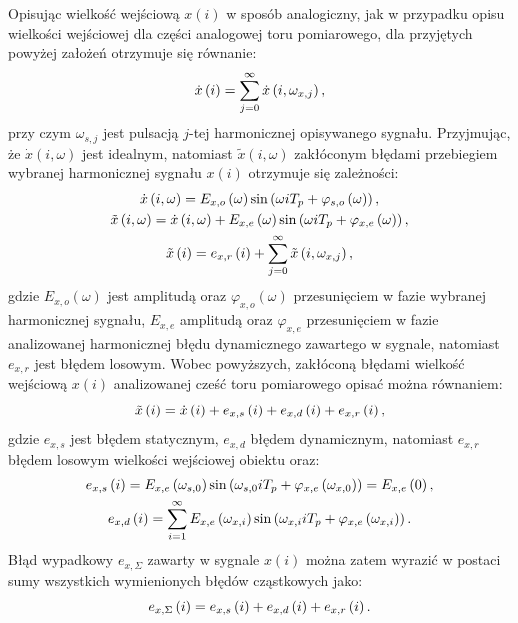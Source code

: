 Opisując wielkość wejściową $x(i)$ w sposób analogiczny, jak w przypadku opisu wielkości wejściowej dla części analogowej toru pomiarowego, dla przyjętych powyżej założeń otrzymuje się równanie:
\begin{equation}
\dot{x} \left(i\right) = \sum _{j = 0} ^{\infty} \dot{x} \left( i, \omega_{x,j} \right) \label{eq:in_disc_sum},
\end{equation}
przy czym $\omega_{s,j}$ jest pulsacją $j$-tej harmonicznej opisywanego sygnału. Przyjmując, że $\dot{x}(i, \omega)$ jest idealnym, natomiast $\tilde{x}(i, \omega)$ zakłóconym błędami przebiegiem wybranej harmonicznej sygnału $x(i)$ otrzymuje się zależności:
\begin{gather}
\dot{x} \left( i, \omega \right) = E_{x,o} \left(\omega\right) \sin \left( \omega iT_{p} + \varphi_{s,o} \left(\omega\right) \right) \label{eq:in_disc_omega_ideal}, \\
\tilde{x} \left( i, \omega \right) = \dot{x} \left( i, \omega \right) + E_{x,e} \left(\omega\right) \sin \left( \omega iT_{p} + \varphi_{x,e} \left(\omega\right) \right) \label{eq:in_disc_omega_real}, \\
\tilde{x} \left(i\right) = e_{x,r} \left(i\right) + \sum _{j = 0} ^{\infty} \tilde{x} \left( i, \omega_{x,j} \right) \label{eq:in_disc_sum_real},
\end{gather}
gdzie $E_{x,o}(\omega)$ jest amplitudą oraz $\varphi_{x,o}(\omega)$ przesunięciem w fazie wybranej harmonicznej sygnału, $E_{x,e}$ amplitudą oraz $ \varphi_{x,e}$ przesunięciem w fazie analizowanej harmonicznej błędu dynamicznego zawartego w sygnale, natomiast $e_{x,r}$ jest błędem losowym. Wobec powyższych, zakłóconą błędami wielkość wejściową $x(i)$ analizowanej cześć toru pomiarowego opisać można równaniem:
\begin{equation}
\tilde{x} \left(i\right) = \dot{x} \left(i\right) + e_{x,s} \left(i\right) + e_{x,d} \left(i\right) + e_{x,r} \left(i\right) \label{eq:in_disc_real},
\end{equation}
gdzie $e_{x,s}$ jest błędem statycznym, $e_{x,d}$ błędem dynamicznym, natomiast $e_{x,r}$ błędem losowym wielkości wejściowej obiektu oraz:
\begin{gather}
e_{x,s} \left(i\right) = E_{x,e} \left(\omega_{s,0}\right) \sin \left( \omega_{s,0} iT_{p} + \varphi_{x,e} \left(\omega_{x,0}\right) \right) = E_{x,e} \left(0\right) \label{eq:in_disc_err_stat}, \\
e_{x,d} \left(i\right) = \sum _{i = 1} ^{\infty} E_{x,e} \left(\omega_{x,i}\right) \sin \left( \omega_{x,i} iT_{p} + \varphi_{x,e} \left(\omega_{x,i}\right) \right) \label{eq:in_disc_err_dyn}.
\end{gather}
Błąd wypadkowy $e_{x,\Sigma}$ zawarty w sygnale $x(i)$ można zatem wyrazić w postaci sumy wszystkich wymienionych błędów cząstkowych jako:
\begin{equation}
e_{x,\Sigma} \left(i\right) = e_{x,s} \left(i\right) + e_{x,d} \left(i\right) + e_{x,r} \left(i\right) \label{eq:in_disc_err_sum}.
\end{equation}

